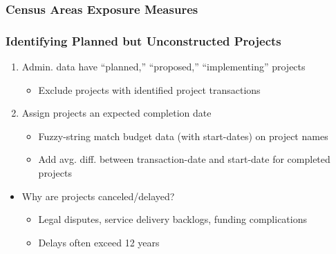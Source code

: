 \documentclass[aspectratio=149]{beamer}
\begin{document}

\begin{frame}
\frametitle{Census Areas Exposure Measures}
\begin{center}
\begin{figure}
\vspace{-3mm}
\end{figure}
\end{center}
\end{frame}



\begin{frame}
\frametitle{Identifying Planned but Unconstructed Projects}

\begin{enumerate}
  \item Admin. data have ``planned,'' ``proposed,'' ``implementing'' projects
    \begin{itemize}
      \item Exclude projects with identified project transactions
    \end{itemize}

    \vspace{.2cm}

  \item Assign projects an expected completion date
    \begin{itemize}
      \item Fuzzy-string match budget data (with start-dates) on project names
      \item Add avg. diff. between transaction-date and start-date for completed projects
    \end{itemize}
\end{enumerate}

\begin{itemize}
  \item Why are projects canceled/delayed? 
    \begin{itemize}
      \item Legal disputes, service delivery backlogs, funding complications
      \item Delays often exceed 12 years 
    \end{itemize} 
\end{itemize}

\end{frame}
\end{document}
